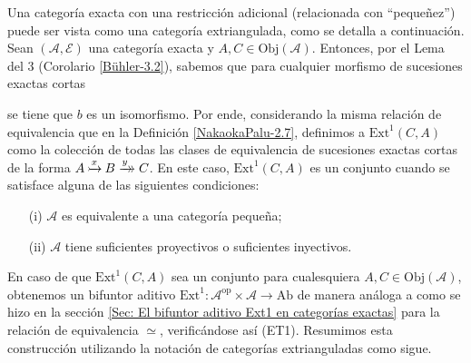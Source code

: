 \documentclass[tesis]{subfiles}
\begin{document}
\begin{Ejem}\cite[Example 2.13]{NakaokaPalu}\label{NakaokaPalu-2.13}
    Una categoría exacta con una restricción adicional (relacionada con ``pequeñez'') puede ser vista como una categoría extriangulada, como se detalla a continuación. \\

    Sean $(\mathscr{A},\mathscr{E})$ una categoría exacta y $A,C\in\text{Obj}(\mathscr{A})$. Entonces, por el Lema del 3 (Corolario \ref{Bühler-3.2}), sabemos que para cualquier morfismo de sucesiones exactas cortas
    \begin{center}
    \end{center}
    se tiene que $b$ es un isomorfismo. Por ende, considerando la misma relación de equivalencia que en la Definición \ref{NakaokaPalu-2.7}, definimos a $\text{Ext}^1(C,A)$ como la colección de todas las clases de equivalencia de sucesiones exactas cortas de la forma $A\xrightarrow[]{x}\mathrel{\mkern-21mu}\rightarrowtail B\xrightarrow[]{y}\mathrel{\mkern-14mu}\rightarrow C$. En este caso, $\text{Ext}^1(C,A)$ es un conjunto cuando se satisface alguna de las siguientes condiciones:

    \begin{enumerate}
    
        \item[(i)] $\mathscr{A}$ es equivalente a una categoría pequeña;

        \item[(ii)] $\mathscr{A}$ tiene suficientes proyectivos o suficientes inyectivos.
    \end{enumerate}

    En caso de que $\text{Ext}^1(C,A)$ sea un conjunto para cualesquiera $A,C\in\text{Obj}(\mathscr{A})$, obtenemos un bifuntor aditivo $\text{Ext}^{1}:\mathscr{A}^\text{op}\times\mathscr{A}\to \text{Ab}$ de manera análoga a como se hizo en la sección \ref{Sec: El bifuntor aditivo Ext1 en categorías exactas} para la relación de equivalencia $\simeq$, verificándose así (ET1). Resumimos esta construcción utilizando la notación de categorías extrianguladas como sigue.

    \begin{itemize}
    

\end{itemize}
\end{Ejem}
\end{document}

